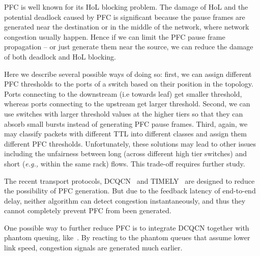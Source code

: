  PFC is well known for its HoL
blocking problem. The damage of HoL and the potential deadlock caused by PFC is
significant because the pause frames are generated near the destination or in
the middle of the network, where network congestion usually happen. Hence if we
can limit the PFC pause frame propagation -- or just generate them near the
source, we can reduce the damage of both deadlock and HoL blocking.

Here we describe several possible ways of doing so: first, we can assign
different PFC thresholds to the ports of a switch based on their position in the
topology. Ports connecting to the downstream (i.e towards leaf) get smaller
threshold, whereas ports connecting to the upstream get larger threshold.
Second, we can use switches with larger threshold values at the higher tiers so
that they can absorb small bursts instead of generating PFC pause frames. Third,
again, we may classify packets with different TTL into different classes and
assign them different PFC thresholds.  Unfortunately, these solutions may lead
to other issues including the unfairness between long (across different high
tier switches) and short ({\em e.g.,} within the same rack) flows.  This
trade-off requires further study.

 The recent transport protocols,
DCQCN~\cite{dcqcn} and TIMELY~\cite{timely} are designed to reduce the
possibility of PFC generation. But due to the feedback latency of end-to-end
delay, neither algorithm can detect congestion instantaneously, and thus they
cannot completely prevent PFC from been generated.

One possible way to further reduce PFC is to integrate DCQCN together with
phantom queuing, like~\cite{Alizadeh12}. By reacting to the phantom queues that
assume lower link speed, congestion signals are generated much earlier.

